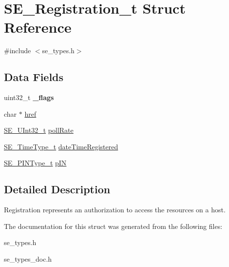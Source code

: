\hypertarget{structSE__Registration__t}{}\section{S\+E\+\_\+\+Registration\+\_\+t Struct Reference}
\label{structSE__Registration__t}


{\ttfamily \#include $<$se\+\_\+types.\+h$>$}

\subsection*{Data Fields}
\begin{DoxyCompactItemize}
\item 
uint32\+\_\+t {\bfseries \+\_\+flags}
\item 
char $\ast$ \hyperlink{group__Registration_ga76fcf14a2f87084c2513efdfe08f25b5}{href}
\item 
\hyperlink{group__UInt32_ga70bd4ecda3c0c85d20779d685a270cdb}{S\+E\+\_\+\+U\+Int32\+\_\+t} \hyperlink{group__Registration_ga7168a63281b2883dea8ab4f1366e854b}{poll\+Rate}
\item 
\hyperlink{group__TimeType_ga6fba87a5b57829b4ff3f0e7638156682}{S\+E\+\_\+\+Time\+Type\+\_\+t} \hyperlink{group__Registration_gabd2cd11ffd9eed1da4ff688b6be28b19}{date\+Time\+Registered}
\item 
\hyperlink{group__PINType_ga30be98f3ca9ec3c8261d0bb63307bc85}{S\+E\+\_\+\+P\+I\+N\+Type\+\_\+t} \hyperlink{group__Registration_ga81325290ed2a058059fb75d933c159ae}{p\+IN}
\end{DoxyCompactItemize}


\subsection{Detailed Description}
Registration represents an authorization to access the resources on a host. 

The documentation for this struct was generated from the following files\+:\begin{DoxyCompactItemize}
\item 
se\+\_\+types.\+h\item 
se\+\_\+types\+\_\+doc.\+h\end{DoxyCompactItemize}
